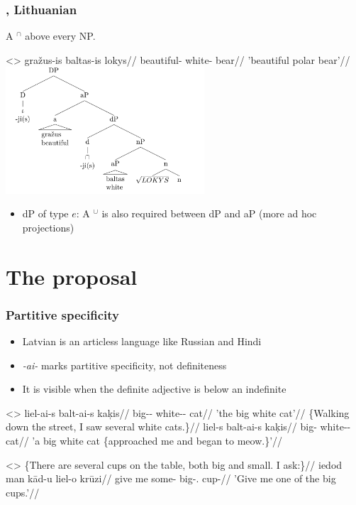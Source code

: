 \documentclass[9pt, t]{beamer}
\begin{document}
\begin{frame}
    \frametitle{\citep{sereikaite2017}, Lithuanian}

    A $^\cap$ above every NP.

    \ex<>
        \begingl
            \gla gražus-is baltas-is lokys//
            \glb beautiful-\Def{} white-\Def{} bear//
            \glft 'beautiful polar bear'//
        \endgl
    \xe
    \includegraphics[width=20em]{sereitree.png}

    \pause
    \begin{itemize}
        \item dP of type $e$: A $^\cup$ is also required between dP and aP (more ad hoc projections)
    \end{itemize}

\end{frame}

\section{The proposal}
\begin{frame}
    \frametitle{Partitive specificity}

    \begin{itemize}
        \item Latvian is an articless language like Russian and Hindi \citep{dayal2004}
        \item \textit{-ai-} marks partitive specificity, not definiteness \citep{enc1991}
        \item It is visible when the definite adjective is below an indefinite
    \end{itemize}
      
    \pex<>
        \a \begingl
            \gla liel-ai-s balt-ai-s kaķis//
            \glb big-\Def-\Nom{} white-\Def-\Nom{} cat//
            \glft 'the big white cat'//
        \endgl
        \a \begingl
            \glpreamble \{Walking down the street, I saw several white cats.\}//
            \gla liel-s balt-ai-s kaķis//
            \glb big-\Nom{} white-\Def-\Nom{} cat//
            \glft 'a big white cat \{approached me and began to meow.\}'//
        \endgl
    \xe

    \ex<>
        \begingl
            \glpreamble \{There are several cups on the table, both big and small. I ask:\}//
            \gla iedod man kād-u liel-o krūzi//
            \glb give me some-\Acc{} big-\Def{}.\Acc{} cup-\Acc{}//
            \glft 'Give me one of the big cups.'//
        \endgl
    \xe

\end{frame}
\end{document}
